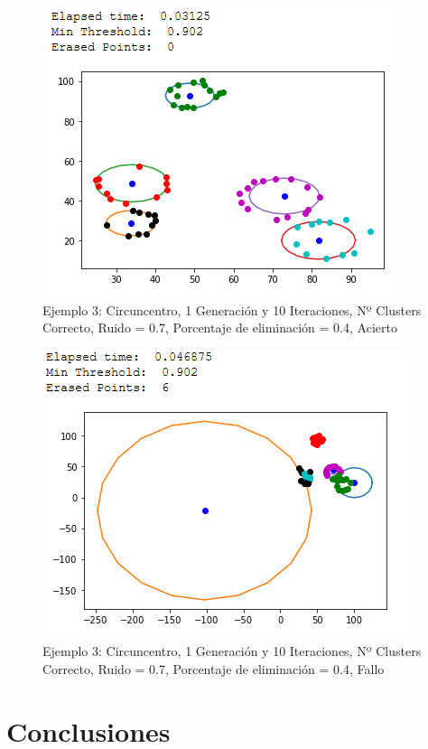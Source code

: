 \documentclass[conference,a4paper]{IEEEtran}
\begin{document}
\begin{figure}[H]
\centering
\includegraphics[scale=0.65]{Experimentacion/Ejemplo3/ej3_c_1_10_re_correct}
\caption{Ejemplo 3: Circuncentro, 1 Generación y 10 Iteraciones,  Nº Clusters Correcto, Ruido = 0.7, Porcentaje de eliminación = 0.4, Acierto\\}
\end{figure}

\begin{figure}[H]
\centering
\includegraphics[scale=0.65]{Experimentacion/Ejemplo3/ej3_c_1_10_re_wrong}
\caption{Ejemplo 3: Circuncentro, 1 Generación y 10 Iteraciones,  Nº Clusters Correcto, Ruido = 0.7, Porcentaje de eliminación = 0.4, Fallo\\}
\end{figure}

\clearpage
\section{Conclusiones}
\end{document}

